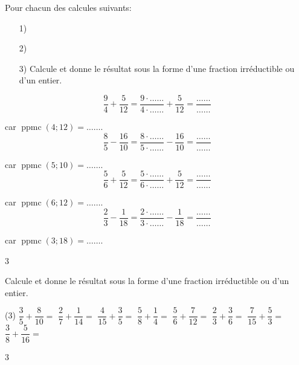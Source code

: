 \documentclass[a4paper,11pt]{report}
\begin{document}
\begin{exop}
{Pour chacun des calcules suivants:
	\begin{enumerate}
    \item[1)] 
    \item[2)] 
    \item[3)] {\text Calcule et donne le résultat sous la forme d'une fraction irréductible ou d'un entier.}
\end{enumerate}
\vspace{5pt}

\begin{tasks}
	\task \[\dfrac{9}{4}+\dfrac{5}{12}=\dfrac{9\cdot\ldots\ldots}{4\cdot\ldots\ldots}+\dfrac{5}{12}=\dfrac{\ldots\ldots}{\ldots\ldots}\]
		\vspace{5pt}

		car $\operatorname{ppmc}(4;12)=\ldots\ldots$. 
	\task \[\dfrac{8}{5}-\dfrac{16}{10}=\dfrac{8\cdot\ldots\ldots}{5\cdot\ldots\ldots}-\dfrac{16}{10}=\dfrac{\ldots\ldots}{\ldots\ldots}\]
		\vspace{5pt}

	car $\operatorname{ppmc}(5;10)=\ldots\ldots$.
	\task \[\dfrac{5}{6}+\dfrac{5}{12}=\dfrac{5\cdot\ldots\ldots}{6\cdot\ldots\ldots}+\dfrac{5}{12}=\dfrac{\ldots\ldots}{\ldots\ldots}\]
		\vspace{5pt}

		car $\operatorname{ppmc}(6;12)=\ldots\ldots$.
	\task \[\dfrac{2}{3}-\dfrac{1}{18}=\dfrac{2\cdot\ldots\ldots}{3\cdot\ldots\ldots}-\dfrac{1}{18}=\dfrac{\ldots\ldots}{\ldots\ldots}\]
		\vspace{5pt}

	car $\operatorname{ppmc}(3;18)=\ldots\ldots$.
\end{tasks}}
{3}
\end{exop}

\begin{exo}
{Calcule et donne le résultat sous la forme d'une fraction irréductible ou d'un entier. 
\begin{tasks}(3)
\task $\dfrac{3}{5}+\dfrac{8}{10}=$
\task $\dfrac{2}{7}+\dfrac{1}{14}=$
\task $\dfrac{4}{15}+\dfrac{3}{5}=$
\task $\dfrac{5}{8}+\dfrac{1}{4}=$
\task $\dfrac{5}{6}+\dfrac{7}{12}=$
\task $\dfrac{2}{3}+\dfrac{3}{6}=$
\task $\dfrac{7}{15}+\dfrac{5}{3}=$
\task $\dfrac{3}{8}+\dfrac{5}{16}=$
\end{tasks}
}{3}
\end{exo}
\end{document}
